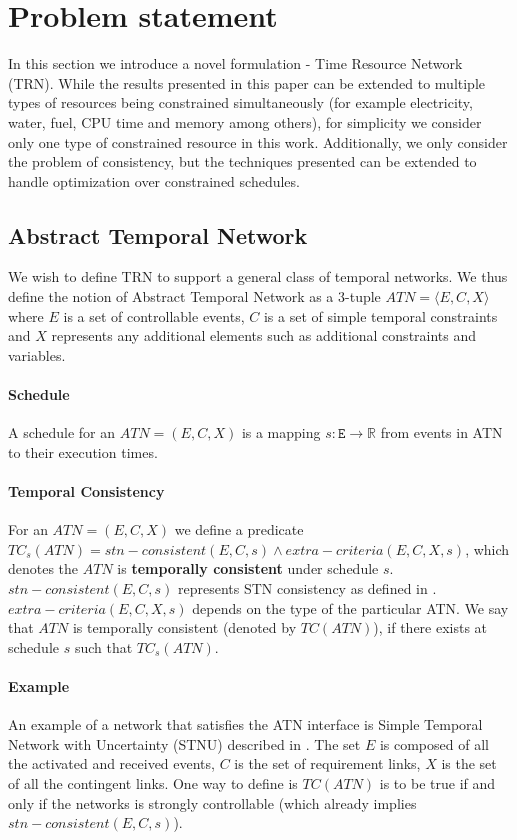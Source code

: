 \section{Problem statement}
In this section we introduce a novel formulation - Time Resource Network (TRN). While the results presented in this paper can be extended to multiple types of resources being constrained simultaneously (for example electricity, water, fuel, CPU time and memory among others), for simplicity we consider only one type of constrained resource in this work. Additionally, we only consider the problem of consistency, but the techniques presented can be extended to handle optimization over constrained schedules.

\subsection{Abstract Temporal Network}
We wish to define TRN to support a general class of temporal networks. We thus define the notion of Abstract Temporal Network as a 3-tuple $ATN=\langle E, C, X\rangle$ where $E$ is a set of controllable events, $C$ is a set of simple temporal constraints \cite{dechter1991temporal} and $X$ represents any additional elements such as additional constraints and variables.

\paragraph{Schedule}
A schedule for an $ATN=(E,C,X)$ is a mapping $s: \texttt{E} \rightarrow \mathbb{R}$ from events in ATN to their execution times.

\paragraph{Temporal Consistency}
\label{temporal_consistency}
For an $ATN=(E,C,X)$ we define a predicate $TC_s(ATN) = stn-consistent(E,C,s) \wedge extra-criteria(E,C,X,s)$, which denotes the $ATN$ is \textbf{temporally consistent} under schedule $s$. $stn-consistent(E,C,s)$ represents STN consistency as defined in \cite{dechter1991temporal}.  $extra-criteria(E,C,X,s)$ depends on the type of the particular ATN. We say that $ATN$ is temporally consistent (denoted by $TC(ATN)$), if there exists at schedule $s$ such that $TC_s(ATN)$.

\paragraph{Example}
An example of a network that satisfies the ATN interface is Simple Temporal Network with Uncertainty (STNU) described in \cite{vidal1996dealing}. The set $E$ is composed of all the activated and received events, $C$ is the set of requirement links, $X$ is the set of all the contingent links. One way to define is $TC(ATN)$ is to be true if and only if the networks is strongly controllable (which already implies $stn-consistent(E,C,s)$).

